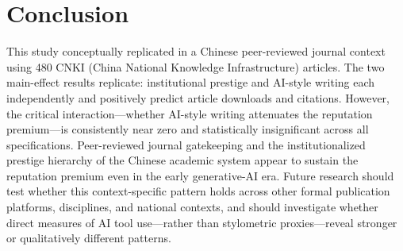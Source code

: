\documentclass[12pt,a4paper]{article}
\begin{document}
\section{Conclusion}
\label{sec:conclusion}

This study conceptually replicated \citet{JoLi2026} in a Chinese
peer-reviewed journal context using 480 CNKI
(China National Knowledge Infrastructure) articles.
The two main-effect results replicate: institutional prestige and
AI-style writing each independently and positively predict article
downloads and citations.
However, the critical interaction---whether AI-style writing attenuates
the reputation premium---is consistently near zero and statistically
insignificant across all specifications.
Peer-reviewed journal gatekeeping and the institutionalized prestige
hierarchy of the Chinese academic system appear to sustain the
reputation premium even in the early generative-AI era.
Future research should test whether this context-specific pattern holds
across other formal publication platforms, disciplines, and national
contexts, and should investigate whether direct measures of AI tool
use---rather than stylometric proxies---reveal stronger or
qualitatively different patterns.
\end{document}
